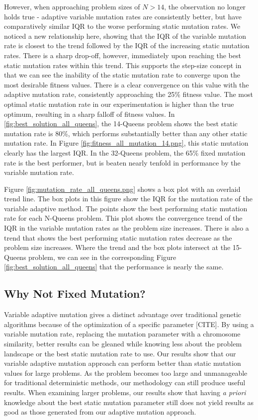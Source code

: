 \documentclass{sig-alternate}
\begin{document}
However, when approaching problem sizes of $N > 14$, the observation no longer holds true - adaptive variable mutation rates are consistently better, but have comparatively similar IQR to the worse performing static mutation rates. We noticed a new relationship here, showing that the IQR of the variable mutation rate is closest to the trend followed by the IQR of the increasing static mutation rates. There is a sharp drop-off, however, immediately upon reaching the best static mutation rates within this trend. This supports the step-size concept in that we can see the inability of the static mutation rate to converge upon the most desirable fitness values. There is a clear convergence on this value with the adaptive mutation rate, consistently approaching the 25\% fitness value. The most optimal static mutation rate in our experimentation is higher than the true optimum, resulting in a sharp falloff of fitness values. In \ref{fig:best_solution_all_queens}, the 14-Queens problem shows the best static mutation rate is 80\%, which performs substantially better than any other static mutation rate. In Figure \ref{fig:fitness_all_mutation_14.png}, this static mutation clearly has the largest IQR. In the 32-Queens problem, the 65\% fixed mutation rate is the best performer, but is beaten nearly tenfold in performance by the variable mutation rate.

Figure \ref{fig:mutation_rate_all_queens.png} shows a box plot with an overlaid trend line. The box plots in this figure show the IQR for the mutation rate of the variable adaptive method. The points show the best performing static mutation rate for each N-Queens problem. This plot shows the convergence trend of the IQR in the variable mutation rates as the problem size increases. There is also a trend that shows the best performing static mutation rates decrease as the problem size increases. Where the trend and the box plots intersect at the 15-Queens problem, we can see in the corresponding Figure \ref{fig:best_solution_all_queens} that the performance is nearly the same.


\subsection{Why Not Fixed Mutation?}
Variable adaptive mutation gives a distinct advantage over traditional genetic algorithms because of the optimization of a specific parameter [CITE]. By using a variable mutation rate, replacing the mutation parameter with a chromosome similarity, better results can be gleaned while knowing less about the problem landscape or the best static mutation rate to use. Our results show that our variable adaptive mutation approach can perform better than static mutation values for large problems. As the problem becomes too large and unmanageable for traditional deterministic methods, our methodology can still produce useful results. When examining larger problems, our results show that having \emph{a priori} knowledge about the best static mutation parameter still does not yield results as good as those generated from our adaptive mutation approach.
\end{document}
